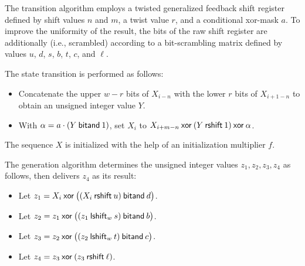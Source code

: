 \pnum
The transition algorithm
employs a twisted generalized feedback shift register
defined by shift values $n$ and $m$, a twist value $r$,
and a conditional xor-mask $a$.
To improve the uniformity of the result,
the bits of the raw shift register are additionally 
(i.e., scrambled) according to a bit-scrambling matrix
defined by values $u$, $d$, $s$, $b$, $t$, $c$, and $\ell$.

The state transition is performed as follows:
\begin{itemize}
 \item
   Concatenate
     the upper $w-r$ bits of $X_{i-n}$
   with
     the lower $r$ bits of $X_{i+1-n}$
   to obtain an unsigned integer value $Y$.
 \item
   With $\alpha = a \cdot (Y \mathbin{\mathsf{bitand}} 1)$,
   set $X_i$ to
     $X_{i+m-n} \mathbin{\mathsf{xor}} (Y \mathbin{\mathsf{rshift}} 1) \mathbin{\mathsf{xor}} \alpha$.
\end{itemize}
The sequence $X$ is initialized
with the help of an initialization multiplier $f$.

\pnum
The generation algorithm
 determines the unsigned integer values $z_1, z_2, z_3, z_4$ as follows,
 then delivers $z_4$ as its result:
\begin{itemize}
 \item
   Let $z_1 = X_i \mathbin{\mathsf{xor}} \bigl(( X_i \mathbin{\mathsf{rshift}} u ) \mathbin{\mathsf{bitand}} d\bigr)$.
 \item
   Let $z_2 = z_1 \mathbin{\mathsf{xor}} \bigl( (z_1 \mathbin{\mathsf{lshift}_{w}} s) \mathbin{\mathsf{bitand}} b \bigr)$.
 \item
   Let $z_3 = z_2 \mathbin{\mathsf{xor}} \bigl( (z_2 \mathbin{\mathsf{lshift}_{w}} t) \mathbin{\mathsf{bitand}} c \bigr)$.
 \item
   Let $z_4 = z_3 \mathbin{\mathsf{xor}} ( z_3 \mathbin{\mathsf{rshift}} \ell )$.
\end{itemize}

